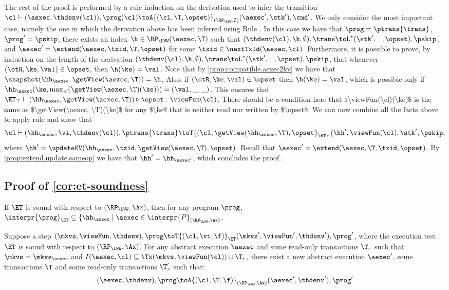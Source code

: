 The rest of the proof is performed by a rule induction on the derivation used to infer 
the transition $\cl \vdash (\aexec, \thdenv(\cl)), \prog(\cl) \toA{(\cl, \T, \opset)}_{(\RP_{\LWW}, \emptyset)} (\aexec', \stk'), \cmd'$. 
We only consider the most important case, namely the one in which the derivation above 
has been inferred using Rule . In this case we have that 
$\prog = \ptrans{\trans}$, $\prog' = \pskip$, there exists an index $\h \in \RP_{\LWW}(\aexec, \T)$ such that 
$(\thdenv(\cl), \h, \emptyset), \trans \toL^{\ast} (\stk', \_, \opset), \pskip$, and $\aexec' = 
\extend(\aexec, \txid, \T, \opset)$ for some $\txid \in \nextTxId(\aexec, \cl)$. 
Furthermore, it is possible to prove, by induction on the length of the derivation $(\thdenv(\cl), \h, \emptyset), \trans \toL^{\ast} (\stk', \_, \opset), \pskip$, 
that whenever $(\otR, \ke, \val) \in \opset$, then $\h(\ke) = \val$.
Note that by \cref{prop:compatible.aexec2kv} we have that $\snapshot(\hh_{\aexec}, \getView(\aexec, \T)) = 
\h$. Also, if $(\otR,\ke, \val) \in \opset$ then $\h(\ke) = \val$, which is possible only if  
$\hh_{\aexec}(\ke, \max_{<}(\getView(\aexec, \T)(\ke))) = (\val, \_, \_)$. This ensures 
that $\ET_{\top} \vdash (\hh_{\aexec}, \getView(\aexec, \T)) \triangleright \opset: \viewFun(\cl)$. 
\ac{There should be a condition here that $\viewFun(\cl)(\ke)$ is the same as $\getView(\aexec, \T)(\ke)$ 
for any $\ke$ that is neither read nor written by $\opset$.} 
We can now combine all the facts above to apply rule  and show that 
\[
\cl \vdash (\hh_{\aexec}, \vi, \thdenv(\cl)), \ptrans{\trans} \toT{(\cl, \getView(\hh_{\aexec}, \T), \opset}_{\ET_{\top}} 
(\hh', \viewFun(\cl), \stk', \pskip, 
\] 
where $\hh' = \updateKV(\hh_{\aexec}, \txid, \getView(\aexec, \T), \opset)$. 
Recall that $\aexec' = \extend(\aexec, \T, \txid, \opset)$. 
By \cref{prop:extend.update.sameop} we have that $\hh' = \hh_{\aexec'}$, 
which concludes the proof.

\subsection{Proof of \cref{cor:et-soundness}}

If $\ET$ is sound with respect to $(\RP_{\LWW}, \Ax)$, then 
for any program $\prog$, $\interpr{\prog}_{\ET} \subseteq \{ \hh_{\aexec} \mid \aexec \in \interpr{P}_{(\RP_{\LWW}, \Ax)}$.

\begin{lemma}
    \label{lem:aux-et-soundness-single-step-sound}
    Suppose a step \( (\mkvs, \viewFun, \thdenv), \prog \toT{(\cl, \vi, \f)}_{\ET} (\mkvs', \viewFun', \thdenv'), \prog' \), where the execution test \( \ET \) is sound with respect to \( (\RP_{\LWW}, \Ax) \).
    For any abstract execution \( \aexec \) and some read-only transactions \( \T_{r} \) such that \( \mkvs = \mkvs_\aexec \) and \( I(\aexec, \cl) \subseteq \Tx(\mkvs, \viewFun(\cl)) \cup \T_{r}\),
    there exist a new abstract execution \( \aexec' \), some transactions \( \T \) and some read-only transactions \( \T'_{r} \) such that: 
    \[
        (\aexec, \thdenv), \prog \toA{(\cl, \T, \f)}_{(\RP_{\LWW}, \Ax)} (\aexec', \thdenv'), \prog'
    \]
\end{lemma}


